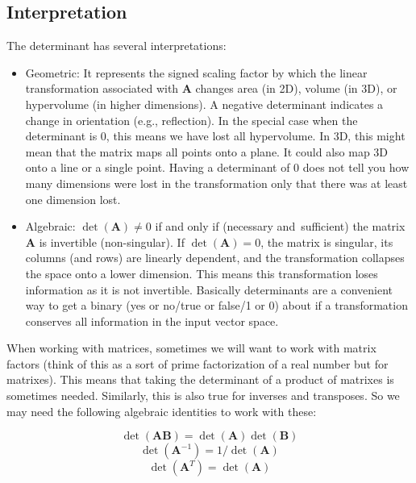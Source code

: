 \documentclass{article}
\newcommand{\mat}[1]{\bm{#1}}  %
\begin{document}
\subsection*{Interpretation}
The determinant has several interpretations:
\begin{itemize}
    \item Geometric: It represents the signed scaling factor by which the linear transformation associated with $\mat{A}$ changes area (in 2D), volume (in 3D), or hypervolume (in higher dimensions). A negative determinant indicates a change in orientation (e.g., reflection). In the special case when the determinant is $0$, this means we have lost all hypervolume. In 3D, this might mean that the matrix maps all points onto a plane. It could also map 3D onto a line or a single point. Having a determinant of $0$ does not tell you how many dimensions were lost in the transformation only that there was at least one dimension lost.
    \item Algebraic: $\det(\mat{A}) \neq 0$ if and only if (necessary and sufficient) the matrix $\mat{A}$ is invertible (non-singular). If $\det(\mat{A}) = 0$, the matrix is singular, its columns (and rows) are linearly dependent, and the transformation collapses the space onto a lower dimension. This means this transformation loses information as it is not invertible. Basically determinants are a convenient way to get a binary (yes or no/true or false/1 or 0) about if a transformation conserves all information in the input vector space.
\end{itemize}
When working with matrices, sometimes we will want to work with matrix factors (think of this as a sort of prime factorization of a real number but for matrixes). This means that taking the determinant of a product of matrixes is sometimes needed. Similarly, this is also true for inverses and transposes. So we may need the following algebraic identities to work with these:

\[
    \det(\mat{A}\mat{B}) = \det(\mat{A})\det(\mat{B})
\]
\[
\det(\mat{A}^{-1}) = 1/\det(\mat{A})
\]
\[
\det(\mat{A}^T) = \det(\mat{A})
\]
\end{document}
